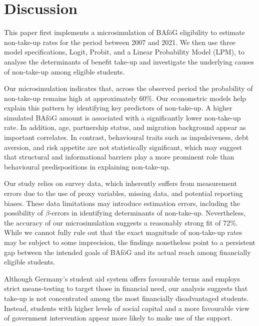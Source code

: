 \section{Discussion}



This paper first implements a microsimulation of BAföG eligibility to estimate non-take-up rates for the period between 2007 and 2021. 
We then use three model specifications, Logit, Probit, and a Linear Probability Model (LPM), to analyse the determinants of benefit take-up and investigate the underlying causes of non-take-up among eligible students. 


Our microsimulation indicates that, across the observed period the probability of non-take-up remains high at approximately 60\%.
Our econometric models help explain this pattern by identifying key predictors of non-take-up. 
A higher simulated BAföG amount is associated with a significantly lower non-take-up rate. 
In addition, age, partnership status, and migration background appear as important correlates.
In contrast, behavioural traits such as impulsiveness, debt aversion, and risk appetite are not statistically significant, which may suggest that structural and informational barriers play a more prominent role than behavioural predispositions in explaining non-take-up.

Our study relies on survey data, which inherently suffers from measurement errors due to the use of proxy variables, missing data, and potential reporting biases. 
These data limitations may introduce estimation errors, including the possibility of \( \beta \)-errors in identifying determinants of non-take-up. 
Nevertheless, the accuracy of our microsimulation suggests a reasonably strong fit of 72\%.
While we cannot fully rule out that the exact magnitude of non-take-up rates may be subject to some imprecision, the findings nonetheless point to a persistent gap between the intended goals of BAföG and its actual reach among financially eligible students.

Although Germany’s student aid system offers favourable terms and employs strict means-testing to target those in financial need, our analysis suggests that take-up is not concentrated among the most financially disadvantaged students. 
Instead, students with higher levels of social capital and a more favourable view of government intervention appear more likely to make use of the support.

